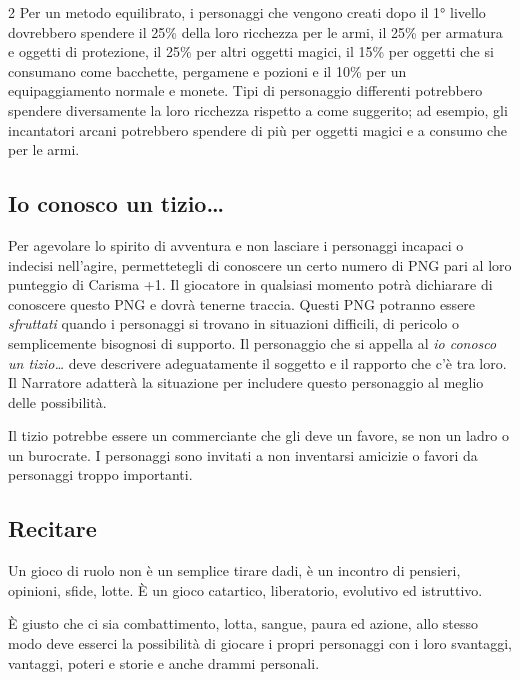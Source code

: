 \begin{multicols}{2}
Per un metodo equilibrato, i personaggi che vengono creati dopo il 1° livello dovrebbero spendere il 25\% della loro ricchezza per le armi, il 25\% per armatura e oggetti di protezione, il 25\% per altri oggetti magici, il 15\% per oggetti che si consumano come bacchette, pergamene e pozioni e il 10\% per un equipaggiamento normale e monete. Tipi di personaggio differenti potrebbero spendere diversamente la loro ricchezza rispetto a come suggerito; ad esempio, gli incantatori arcani potrebbero spendere di più per oggetti magici e a consumo che per le armi.

\subsection{Io conosco un tizio…}\label{ioconoscountizio}\hypertarget{ioconoscountizio}{}

Per agevolare lo spirito di avventura e non lasciare i personaggi incapaci o indecisi nell'agire, permettetegli di conoscere un certo numero di PNG pari al loro punteggio di Carisma +1. Il giocatore in qualsiasi momento potrà dichiarare di conoscere questo PNG e dovrà tenerne traccia. Questi PNG potranno essere \emph{sfruttati} quando i personaggi si trovano in situazioni difficili, di pericolo o semplicemente bisognosi di supporto. Il personaggio che si appella al \emph{io conosco un tizio…} deve descrivere adeguatamente il soggetto e il rapporto che c'è tra loro. Il Narratore adatterà la situazione per includere questo personaggio al meglio delle possibilità.

Il tizio potrebbe essere un commerciante che gli deve un favore, se non un ladro o un burocrate. I personaggi sono invitati a non inventarsi amicizie o favori da personaggi troppo importanti.

\subsection{Recitare}\label{ruolare}

\label{recitare}

Un gioco di ruolo non è un semplice tirare dadi, è un incontro di pensieri, opinioni, sfide, lotte. È un gioco catartico, liberatorio, evolutivo ed istruttivo.

È giusto che ci sia combattimento, lotta, sangue, paura ed azione, allo stesso modo deve esserci la possibilità di giocare i propri personaggi con i loro svantaggi, vantaggi, poteri e storie e anche drammi personali.


\end{multicols}
